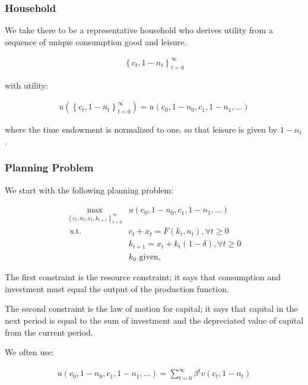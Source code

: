 \documentclass[10pt]{article}
\begin{document}
\subsubsection{Household}

We take there to be a representative household who
derives utility from a sequence of unique consumption
good and leisure. 

\begin{align}
    \left\{c_t, 1-n_t\right\}_{t=0}^{\infty}
\end{align}

with utility:

\begin{align}
    u\left(\left\{c_t, 1-n_t\right\}_{t=0}^{\infty}\right)=u\left(c_0, 1-n_0, c_1, 1-n_1, \ldots\right)
\end{align}

where the time endowment is normalized to one, 
so that leisure is given by $1-n_t$.

\subsubsection{Planning Problem}

We start with the following planning problem:

\begin{align}
        \max _{\left\{c_t, n_t, x_t, k_{t+1}\right\}_{t=0}^{\infty}} & u\left(c_0, 1-n_0, c_1, 1-n_1, \ldots\right) \\
        \text { s.t. } & c_t+x_t=F\left(k_t, n_t\right), \forall t \geq 0 \\
        & k_{t+1}=x_t+k_t(1-\delta), \forall t \geq 0 \\
        & k_0 \text { given, }
\end{align}

The first constraint is the resource constraint; it says 
that consumption and investment must equal the output of the
production function. 

The second constraint is the law of motion for capital; it says that
capital in the next period is equal to the sum of investment and the
depreciated value of capital from the current period.

We often use:

\begin{align}
    u\left(c_0, 1-n_0, c_1, 1-n_1, \ldots\right)=\sum_{t=0}^{\infty} \beta^t v\left(c_t, 1-n_t\right)
\end{align}
\end{document}
